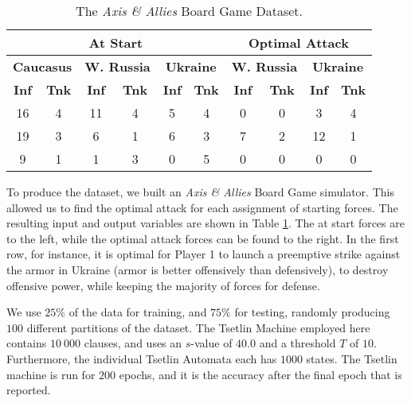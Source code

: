 \documentclass[11pt,a4paper]{article}
\begin{document}
\begin{table}[!bh]
    \centering
    \begin{tabular}{c|c|c|c|c|c||c|c|c|c}
    \multicolumn{6}{c||}{\bf At Start}&\multicolumn{4}{c}{\bf Optimal Attack}\\
    \hline
    \multicolumn{2}{c|}{\bf Caucasus}&\multicolumn{2}{c|}{\bf W. Russia}&\multicolumn{2}{c||}{\bf Ukraine}&\multicolumn{2}{c|}{\bf W. Russia}&\multicolumn{2}{c}{\bf Ukraine}\\
     \hline
    \bf Inf&\bf Tnk&\bf Inf&\bf Tnk&\bf Inf&\bf Tnk&\bf Inf&\bf Tnk&\bf Inf&\bf Tnk\\
    \hline
    \hline
    16&4&11&4&5&4&0&0&3&4\\
    19&3&6&1&6&3&7&2&12&1\\
    9&1&1&3&0&5&0&0&0&0
    \end{tabular}
    \caption{The \emph{Axis \& Allies} Board Game Dataset.}
    \label{table:aa_dataset}
\end{table}

To produce the dataset, we built an \emph{Axis \& Allies} Board Game  simulator. This allowed us to find the optimal attack for each assignment of starting forces. The resulting input and output variables are shown in Table \ref{table:aa_dataset}. The at start forces are to the left, while the optimal attack forces can be found to the right. In the first row, for instance, it is optimal for Player 1 to launch a preemptive strike against the armor in Ukraine (armor is better offensively than defensively), to destroy offensive power, while keeping the majority of forces for defense.

We use $25\%$ of the data for training, and $75\%$ for testing, randomly producing $100$ different partitions of the dataset. The Tsetlin Machine employed here contains $10~000$ clauses, and uses an $s$-value of $40.0$ and a threshold $T$ of $10$. Furthermore, the individual Tsetlin Automata each has $1000$ states. The Tsetlin machine is run for $200$ epochs, and it is the accuracy after the final epoch that is reported.
\end{document}
